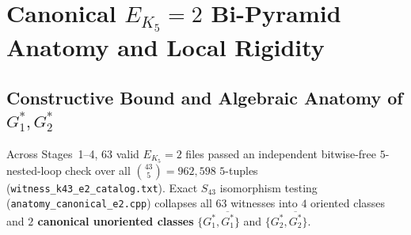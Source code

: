 \documentclass[11pt,a4paper]{article}
\theoremstyle{plain}
\theoremstyle{definition}
\begin{document}
\section{Canonical \texorpdfstring{$E_{K_5}=2$}{E\_K5 = 2} Bi-Pyramid Anatomy and Local Rigidity}
\label{sec:anatomy-rigidity}

\subsection{Constructive Bound and Algebraic Anatomy of \texorpdfstring{$G^*_1, G^*_2$}{G*\_1, G*\_2}}

Across Stages~1--4, $63$ valid $E_{K_5}=2$ files passed an independent bitwise-free $5$-nested-loop check over all $\binom{43}{5} = 962,598$ $5$-tuples (\texttt{witness\_\allowbreak k43\_\allowbreak e2\_\allowbreak catalog.txt}). Exact $S_{43}$ isomorphism testing (\texttt{anatomy\_\allowbreak canonical\_\allowbreak e2.cpp}) collapses all $63$ witnesses into $4$ oriented classes and \textbf{$2$ canonical unoriented classes} $\{G^*_1, \overline{G^*_1}\}$ and $\{G^*_2, \overline{G^*_2}\}$.
\end{document}
